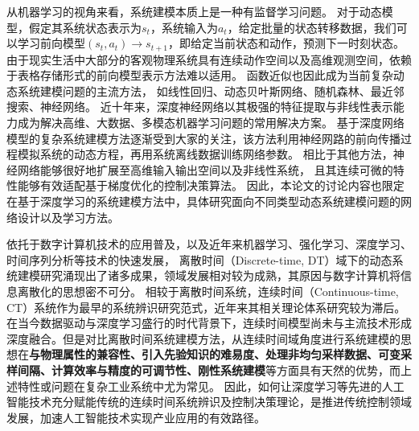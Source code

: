 从机器学习的视角来看，系统建模本质上是一种有监督学习问题\cite{jordan1992forward}。
对于动态模型，假定其系统状态表示为$s_t$，系统输入为$a_t$，给定批量的状态转移数据，我们可以学习前向模型$\left(s_t, a_t\right) \rightarrow s_{t+1}$，即给定当前状态和动作，预测下一时刻状态。
由于现实生活中大部分的客观物理系统具有连续动作空间以及高维观测空间，依赖于表格存储形式的前向模型表示方法难以适用。
函数近似也因此成为当前复杂动态系统建模问题的主流方法，
如线性回归\cite{silver2008sample}、动态贝叶斯网络、随机森林、最近邻搜索、神经网络\cite{werbos1989neural}。
近十年来，深度神经网络以其极强的特征提取与非线性表示能力成为解决高维、大数据、多模态机器学习问题的常用解决方案。
基于深度网络模型的复杂系统建模方法逐渐受到大家的关注，该方法利用神经网路的前向传播过程模拟系统的动态方程\cite{temeng1995model, tan1996nonlinear}，再用系统离线数据训练网络参数。
相比于其他方法，神经网络能够很好地扩展至高维输入输出空间以及非线性系统，
且其连续可微的特性能够有效适配基于梯度优化的控制决策算法。
因此，本论文的讨论内容也限定在基于深度学习的系统建模方法中，具体研究面向不同类型动态系统建模问题的网络设计以及学习方法。


依托于数字计算机技术的应用普及，以及近年来机器学习、强化学习\cite{sutton2018reinforcement}、深度学习\cite{lecun2015deep}\cite{duan2016}、时间序列分析等技术\cite{shumway2000time}的快速发展，
离散时间（Discrete-time, DT）域下的动态系统建模研究涌现出了诸多成果，领域发展相对较为成熟，其原因与数字计算机将信息离散化的思想密不可分。
相较于离散时间系统，连续时间（Continuous-time, CT）系统作为最早的系统辨识研究范式，近年来其相关理论体系研究较为滞后。在当今数据驱动与深度学习盛行的时代背景下，连续时间模型尚未与主流技术形成深度融合。但是对比离散时间系统建模方法，从连续时间域角度进行系统建模的思想在\textbf{与物理属性的兼容性、引入先验知识的难易度、处理非均匀采样数据、可变采样间隔、计算效率与精度的可调节性、刚性系统建模}等方面具有天然的优势，而上述特性或问题在复杂工业系统中尤为常见。
因此，如何让深度学习等先进的人工智能技术充分赋能传统的连续时间系统辨识及控制决策理论，是推进传统控制领域发展，加速人工智能技术实现产业应用的有效路径。


